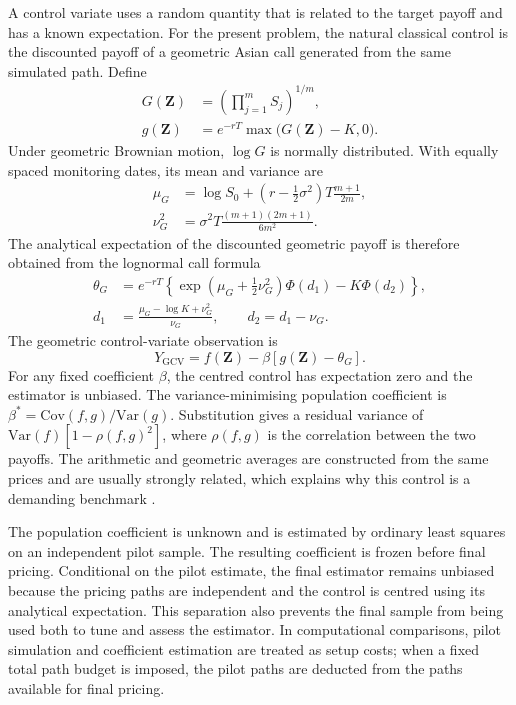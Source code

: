 A control variate uses a random quantity that is related to the target payoff and has a known expectation. For the present problem, the natural classical control is the discounted payoff of a geometric Asian call generated from the same simulated path. Define
\begin{align}
G(\mathbf{Z}) &= \left(\prod_{j=1}^{m} S_j\right)^{1/m},
\label{eq:geometric_average}\\
g(\mathbf{Z}) &= e^{-rT} \max\bigl(G(\mathbf{Z}) - K, 0\bigr).
\label{eq:geometric_payoff}
\end{align}
Under geometric Brownian motion, $\log G$ is normally distributed. With equally spaced monitoring dates, its mean and variance are
\begin{align}
\mu_G &= \log S_0 + \left(r - \tfrac{1}{2}\sigma^2\right)T\frac{m + 1}{2m},
\label{eq:mu_g}\\
\nu_G^2 &= \sigma^2 T \frac{(m + 1)(2m + 1)}{6m^2}.
\label{eq:nu_g}
\end{align}
The analytical expectation of the discounted geometric payoff is therefore obtained from the lognormal call formula
\begin{align}
\theta_G &= e^{-rT}\left\{\exp\left(\mu_G + \tfrac{1}{2}\nu_G^2\right) \Phi(d_1) - K\Phi(d_2)\right\},
\label{eq:theta_g}\\
d_1 &= \frac{\mu_G - \log K + \nu_G^2}{\nu_G}, \qquad d_2 = d_1 - \nu_G.
\label{eq:d1d2_g}
\end{align}
The geometric control-variate observation is
\begin{equation}
Y_{\mathrm{GCV}} = f(\mathbf{Z}) - \beta\left[g(\mathbf{Z}) - \theta_G\right].
\label{eq:gcv_observation}
\end{equation}
For any fixed coefficient $\beta$, the centred control has expectation zero and the estimator is unbiased. The variance-minimising population coefficient is $\beta^* = \mathrm{Cov}(f,g)/\mathrm{Var}(g)$. Substitution gives a residual variance of $\mathrm{Var}(f)\left[1 - \rho(f,g)^2\right]$, where $\rho(f,g)$ is the correlation between the two payoffs. The arithmetic and geometric averages are constructed from the same prices and are usually strongly related, which explains why this control is a demanding benchmark \parencite{kemna_vorst_1990}.

The population coefficient is unknown and is estimated by ordinary least squares on an independent pilot sample. The resulting coefficient is frozen before final pricing. Conditional on the pilot estimate, the final estimator remains unbiased because the pricing paths are independent and the control is centred using its analytical expectation. This separation also prevents the final sample from being used both to tune and assess the estimator. In computational comparisons, pilot simulation and coefficient estimation are treated as setup costs; when a fixed total path budget is imposed, the pilot paths are deducted from the paths available for final pricing.

